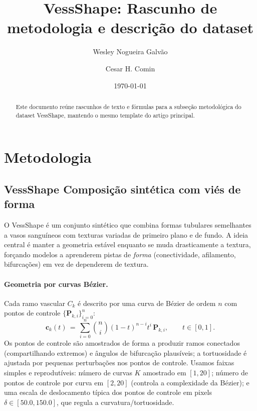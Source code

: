 \documentclass[%
reprint,
nofootinbib,
 amsmath,amssymb,
aps,
superscriptaddress,
showkeys,
longbibliography
]{revtex4-1}
\begin{document}

\title{VessShape: Rascunho de metodologia e descrição do dataset}

\author{Wesley Nogueira Galv\~ao}

\author{Cesar H. Comin}

\date{\today}

\begin{abstract}
Este documento reúne rascunhos de texto e fórmulas para a subseção metodológica do dataset VessShape, mantendo o mesmo template do artigo principal.
\end{abstract}

\maketitle
\thispagestyle{plain}

\section{Metodologia}
\label{s:methodology}

\subsection{VessShape \textemdash{} Composição sintética com viés de forma}
\label{ss:vessshape}

O VessShape é um conjunto sintético que combina formas tubulares semelhantes a vasos sanguíneos com texturas variadas de primeiro plano e de fundo. A ideia central é manter a geometria estável enquanto se muda drasticamente a textura, forçando modelos a aprenderem pistas de \emph{forma} (conectividade, afilamento, bifurcações) em vez de dependerem de textura.

\paragraph*{Geometria por curvas Bézier.}
Cada ramo vascular $C_k$ é descrito por uma curva de Bézier de ordem $n$ com pontos de controle $\{\mathbf{P}_{k,i}\}_{i=0}^n$:
\begin{equation}
\mathbf{c}_k(t) \,=\, \sum_{i=0}^{n} \binom{n}{i} (1-t)^{n-i} t^{i} \, \mathbf{P}_{k,i}, \qquad t \in [0,1].
\label{eq:bezier}
\end{equation}
Os pontos de controle são amostrados de forma a produzir ramos conectados (compartilhando extremos) e ângulos de bifurcação plausíveis; a tortuosidade é ajustada por pequenas perturbações nos pontos de controle. Usamos faixas simples e reprodutíveis: número de curvas $K$ amostrado em $[1,20]$; número de pontos de controle por curva em $[2,20]$ (controla a complexidade da Bézier); e uma escala de deslocamento típica dos pontos de controle em pixels $\delta \in [50.0, 150.0]$, que regula a curvatura/tortuosidade.
\end{document}
